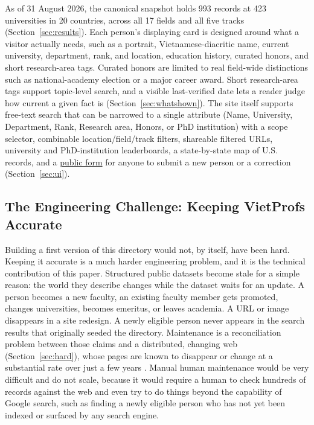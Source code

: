 \documentclass[11pt]{article}
\begin{document}
As of 31 August 2026, the canonical snapshot holds 993 records at 423 universities in 20 countries, across all 17 fields and all five tracks (Section~\ref{sec:results}).
Each person's displaying card is designed around what a visitor actually needs, such as a portrait, Vietnamese-diacritic name, current university, department, rank, and location, education history, curated honors, and short research-area tags.
Curated honors are limited to real field-wide distinctions such as national-academy election or a major career award.
Short research-area tags support topic-level search, and a visible last-verified date lets a reader judge how current a given fact is (Section~\ref{sec:whatshown}).
The site itself supports free-text search that can be narrowed to a single attribute (Name, University, Department, Rank, Research area, Honors, or PhD institution) with a scope selector, combinable location/field/track filters, shareable filtered URLs, university and PhD-institution leaderboards, a state-by-state map of U.S. records, and a \href{https://vietprofs.roars.dev/submit.html}{public form} for anyone to submit a new person or a correction (Section~\ref{sec:ui}).

\subsection{The Engineering Challenge: Keeping VietProfs Accurate}
\label{sec:intro-how}
Building a first version of this directory would not, by itself, have been hard.
Keeping it accurate is a much harder engineering problem, and it is the technical contribution of this paper.
Structured public datasets become stale for a simple reason: the world they describe changes while the dataset waits for an update.
A person becomes a new faculty, an existing faculty member gets promoted, changes universities, becomes emeritus, or leaves academia.
A URL or image disappears in a site redesign.
A newly eligible person never appears in the search results that originally seeded the directory.
Maintenance is a reconciliation problem between those claims and a distributed, changing web (Section~\ref{sec:hard}), whose pages are known to disappear or change at a substantial rate over just a few years \cite{bar-yossef2004sic}.
Manual human maintenance would be very difficult and do not scale, because it would require a human to check hundreds of records against the web and even try to do things beyond the capability of Google search, such as finding a newly eligible person who has not yet been indexed or surfaced by any search engine.
\end{document}
